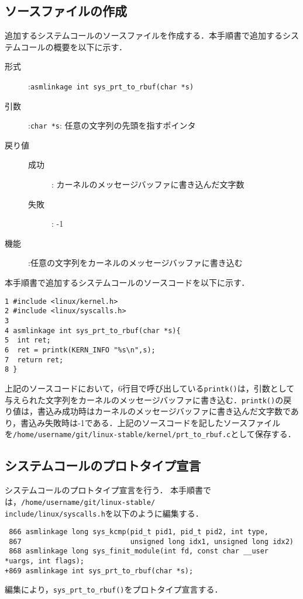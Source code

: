 \documentclass[12pt]{jsarticle}
\begin{document}
\subsection{ソースファイルの作成}
追加するシステムコールのソースファイルを作成する．本手順書で追加するシステムコールの概要を以下に示す．
\begin{description}
  \item[形式] :\verb|asmlinkage int sys_prt_to_rbuf(char *s)|
  \item[引数] :\verb|char *s|: 任意の文字列の先頭を指すポインタ
  \item[戻り値]
  \item[]
    \begin{description}
    \item[成功] : カーネルのメッセージバッファに書き込んだ文字数
    \item[失敗] : -1
    \end{description}
  \item[機能] :任意の文字列をカーネルのメッセージバッファに書き込む
\end{description}
本手順書で追加するシステムコールのソースコードを以下に示す．

\begin{verbatim}
1 #include <linux/kernel.h>
2 #include <linux/syscalls.h>
3
4 asmlinkage int sys_prt_to_rbuf(char *s){
5  int ret;
6  ret = printk(KERN_INFO "%s\n",s);
7  return ret;
8 }
\end{verbatim}
上記のソースコードにおいて，6行目で呼び出している\verb|printk()|は，引数として与えられた文字列をカーネルのメッセージバッファに書き込む．\verb|printk()|の戻り値は，書込み成功時はカーネルのメッセージバッファに書き込んだ文字数であり，書込み失敗時は-1である．上記のソースコードを記したソースファイルを\verb|/home/username/git/linux-stable/kernel/prt_to_rbuf.c|として保存する．
\subsection{システムコールのプロトタイプ宣言}
システムコールのプロトタイプ宣言を行う．
本手順書では，\verb|/home/username/git/linux-stable/|\\
\verb|include/linux/syscalls.h|を以下のように編集する．
\begin{verbatim}
 866 asmlinkage long sys_kcmp(pid_t pid1, pid_t pid2, int type,
 867                          unsigned long idx1, unsigned long idx2)
 868 asmlinkage long sys_finit_module(int fd, const char __user *uargs, int flags);
+869 asmlinkage int sys_prt_to_rbuf(char *s);
\end{verbatim}
編集により，\verb|sys_prt_to_rbuf()|をプロトタイプ宣言する．
\end{document}
